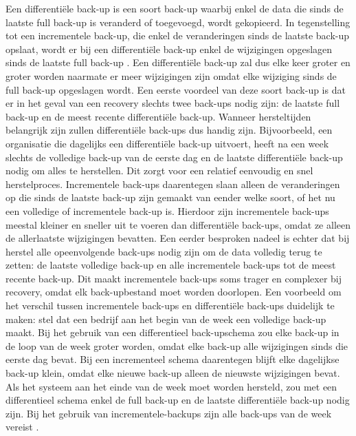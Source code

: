 Een differentiële back-up is een soort back-up waarbij enkel de data die sinds de laatste full back-up is veranderd of toegevoegd, wordt gekopieerd. In tegenstelling tot een incrementele back-up, die enkel de veranderingen sinds de laatste back-up opslaat, wordt er bij een differentiële back-up enkel de wijzigingen opgeslagen sinds de laatste full back-up \autocite{Zhu2015}. Een differentiële back-up zal dus elke keer groter en groter worden naarmate er meer wijzigingen zijn omdat elke wijziging sinds de full back-up opgeslagen wordt. Een eerste voordeel van deze soort back-up is dat er in het geval van een recovery slechts twee back-ups nodig zijn: de laatste full back-up en de meest recente differentiële back-up. Wanneer hersteltijden belangrijk zijn zullen differentiële back-ups dus handig zijn. Bijvoorbeeld, een organisatie die dagelijks een differentiële back-up uitvoert, heeft na een week slechts de volledige back-up van de eerste dag en de laatste differentiële back-up nodig om alles te herstellen. Dit zorgt voor een relatief eenvoudig en snel herstelproces. Incrementele back-ups daarentegen slaan alleen de veranderingen op die sinds de laatste back-up zijn gemaakt van eender welke soort, of het nu een volledige of incrementele back-up is. Hierdoor zijn incrementele back-ups meestal kleiner en sneller uit te voeren dan differentiële back-ups, omdat ze alleen de allerlaatste wijzigingen bevatten. Een eerder besproken nadeel is echter dat bij herstel alle opeenvolgende back-ups nodig zijn om de data volledig terug te zetten: de laatste volledige back-up en alle incrementele back-ups tot de meest recente back-up. Dit maakt incrementele back-ups soms trager en complexer bij recovery, omdat elk back-upbestand moet worden doorlopen. Een voorbeeld om het verschil tussen incrementele back-ups en differentiële back-ups duidelijk te maken: stel dat een bedrijf aan het begin van de week een volledige back-up maakt. Bij het gebruik van een differentieel back-upschema zou elke back-up in de loop van de week groter worden, omdat elke back-up alle wijzigingen sinds die eerste dag bevat. Bij een incrementeel schema daarentegen blijft elke dagelijkse back-up klein, omdat elke nieuwe back-up alleen de nieuwste wijzigingen bevat. Als het systeem aan het einde van de week moet worden hersteld, zou met een differentieel schema enkel de full back-up en de laatste differentiële back-up nodig zijn. Bij het gebruik van incrementele-backups zijn alle back-ups van de week vereist \autocite{Beard2018}.

